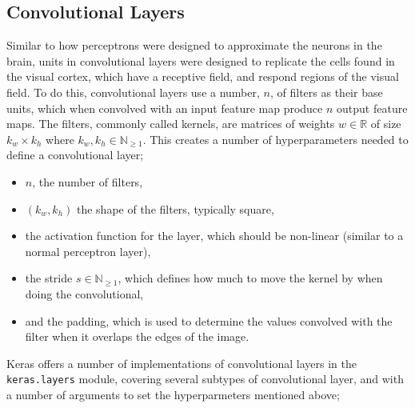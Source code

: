 \documentclass[12pt,a4paper,titlepage]{report}
\let\code\texttt
\begin{document}
	\subsection*{Convolutional Layers}
	Similar to how perceptrons were designed to approximate the neurons in the brain, units in convolutional layers were designed to replicate the cells found in the visual cortex, which have a receptive field, and respond regions of the visual field\cite{cnn-biology}. To do this, convolutional layers use a number, $n$, of filters as their base units, which when convolved with an input feature map produce $n$ output feature maps. The filters, commonly called kernels, are matrices of weights $w \in \mathbb{R}$ of size $k_w \times k_h$ where $k_w, k_h \in \mathbb{N}_{\geq1}$\cite{cnn-analysis}.
	This creates a number of hyperparameters needed to define a convolutional layer;
	\begin{itemize}
	\item $n$, the number of filters,
	\item $(k_w, k_h)$ the shape of the filters, typically square,
	\item the activation function for the layer, which should be non-linear (similar to a normal perceptron layer),
	\item the stride $s \in \mathbb{N}_{\geq1}$, which defines how much to move the kernel by when doing the convolutional,
	\item and the padding, which is used to determine the values convolved with the filter when it overlaps the edges of the image.
	\end{itemize}
	Keras offers a number of implementations of convolutional layers in the \code{keras.layers} module, covering several subtypes of convolutional layer, and with a number of arguments to set the hyperparmeters mentioned above;
\end{document}
